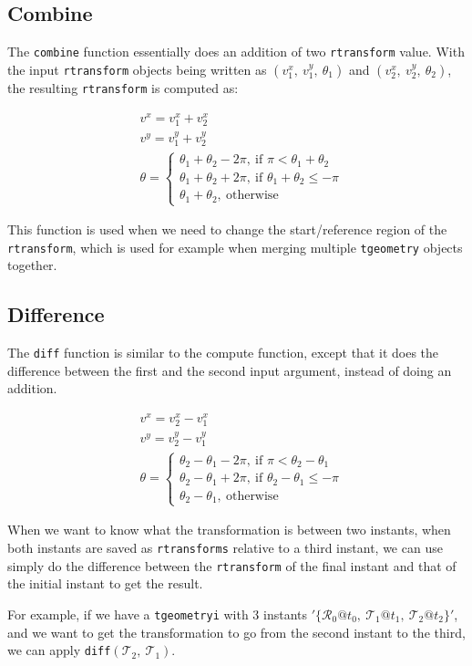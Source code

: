 \subsection{Combine}
\label{section:combine}

The \lstinline{combine} function essentially does an addition of two \lstinline{rtransform} value. With the input \lstinline{rtransform} objects being written as $(v_1^x,\ v_1^y,\ \theta_1)$ and $(v_2^x,\ v_2^y,\ \theta_2)$, the resulting \lstinline{rtransform} is computed as:

\begin{align*}
        & v^x = v_1^x + v_2^x \\
        & v^y = v_1^y + v_2^y \\
        & \theta = 
        \begin{cases}
            \theta_1 + \theta_2 - 2\pi,\ \text{if } \pi < \theta_1 + \theta_2 \\
            \theta_1 + \theta_2 + 2\pi,\ \text{if } \theta_1 + \theta_2 \le -\pi \\
            \theta_1 + \theta_2,\ \text{otherwise}
        \end{cases}
\end{align*}

This function is used when we need to change the start/reference region of the \lstinline{rtransform}, which is used for example when merging multiple \lstinline{tgeometry} objects together.

\subsection{Difference}
\label{section:diff}

The \lstinline{diff} function is similar to the compute function, except that it does the difference between the first and the second input argument, instead of doing an addition.

\begin{align*}
        & v^x = v_2^x - v_1^x \\
        & v^y = v_2^y - v_1^y \\
        & \theta = 
        \begin{cases}
            \theta_2 - \theta_1 - 2\pi,\ \text{if } \pi < \theta_2 - \theta_1 \\
            \theta_2 - \theta_1 + 2\pi,\ \text{if } \theta_2 - \theta_1 \le -\pi \\
            \theta_2 - \theta_1,\ \text{otherwise}
        \end{cases}
\end{align*}

When we want to know what the transformation is between two instants, when both instants are saved as \lstinline{rtransforms} relative to a third instant, we can use simply do the difference between the \lstinline{rtransform} of the final instant and that of the initial instant to get the result.

For example, if we have a \lstinline{tgeometryi} with 3 instants $'\{\mathcal{R}_0@t_0,\ \mathcal{T}_1@t_1,\ \mathcal{T}_2@t_2\}'$, and we want to get the transformation to go from the second instant to the third, we can apply \lstinline{diff}$(\mathcal{T}_2,\ \mathcal{T}_1)$.